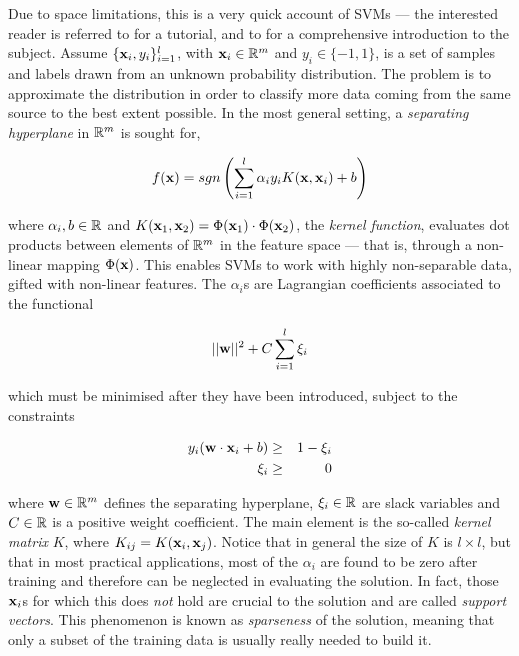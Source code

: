 Due to space limitations, this is a very quick account of SVMs --- the
interested reader is referred to \cite{Burges98,SmolaTut2004} for a
tutorial, and to \cite{Cristianini00} for a comprehensive introduction
to the subject. Assume $\{\mathbf{x}_i,y_i\}_{i=1}^l$, with $\mathbf{x}_i \in \mathbb{R}^m$
and $y_i \in \{-1,1\}$, is a set of samples and labels drawn from an
unknown probability distribution. The problem is to approximate the
distribution in order to classify more data coming from the same
source to the best extent possible. In the most general setting, a
\emph{separating hyperplane} in $\mathbb{R}^m$ is sought for,

\begin{equation} \label{eqn:sol}
  f(\mathbf{x}) = sgn \left( \sum_{i=1}^l \alpha_i y_i K(\mathbf{x},\mathbf{x}_i) + b \right)
\end{equation}

\noindent where $\alpha_i,b \in \mathbb{R}$ and $K(\mathbf{x}_1,\mathbf{x}_2) = \Phi(\mathbf{x}_1)
\cdot \Phi(\mathbf{x}_2)$, the \emph{kernel function}, evaluates dot
products between elements of $\mathbb{R}^m$ in the feature space --- that is,
through a non-linear mapping $\Phi(\mathbf{x})$. This enables SVMs to work
with highly non-separable data, gifted with non-linear features. The
$\alpha_i$s are Lagrangian coefficients associated to the functional

\begin{equation} \label{eqn:svm_primal}
  ||\mathbf{w}||^2 + C \sum_{i=1}^l \xi_i
\end{equation}

\noindent which must be minimised after they have been introduced,
subject to the constraints

\begin{eqnarray} \label{eqn:svm_constr}
  y_i (\mathbf{w}\cdot\mathbf{x}_i + b) & \geq & 1-\xi_i \\
                    \xi_i & \geq & 0       \nonumber
\end{eqnarray}

\noindent where $\mathbf{w} \in \mathbb{R}^m$ defines the separating hyperplane,
$\xi_i \in \mathbb{R}$ are slack variables and $C \in \mathbb{R}$ is a positive
weight coefficient. The main element is the so-called \emph{kernel
matrix} $K$, where $K_{ij} = K(\mathbf{x}_i,\mathbf{x}_j)$. Notice that in general
the size of $K$ is $l \times l$, but that in most practical
applications, most of the $\alpha_i$ are found to be zero after
training and therefore can be neglected in evaluating the solution. In
fact, those $\mathbf{x}_i$s for which this does \emph{not} hold are crucial
to the solution and are called \emph{support vectors}. This phenomenon
is known as \emph{sparseness} of the solution, meaning that only a
subset of the training data is usually really needed to build it.
